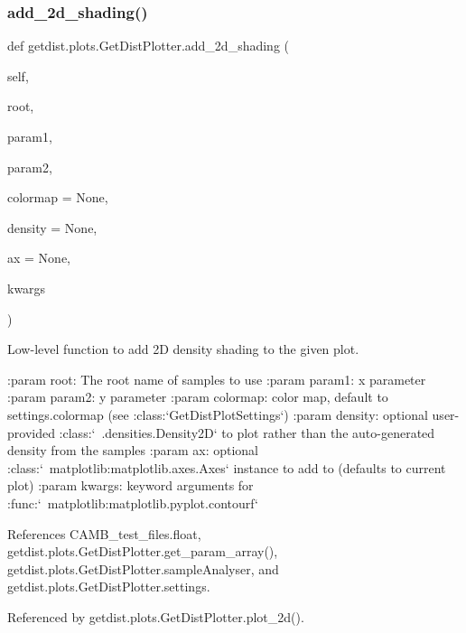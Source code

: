 \subsubsection{\texorpdfstring{add\+\_\+2d\+\_\+shading()}{add\_2d\_shading()}}
{\footnotesize\ttfamily def getdist.\+plots.\+Get\+Dist\+Plotter.\+add\+\_\+2d\+\_\+shading (\begin{DoxyParamCaption}\item[{}]{self,  }\item[{}]{root,  }\item[{}]{param1,  }\item[{}]{param2,  }\item[{}]{colormap = {\ttfamily None},  }\item[{}]{density = {\ttfamily None},  }\item[{}]{ax = {\ttfamily None},  }\item[{}]{kwargs }\end{DoxyParamCaption})}

\begin{DoxyVerb}Low-level function to add 2D density shading to the given plot.

:param root: The root name of samples to use
:param param1: x parameter
:param param2: y parameter
:param colormap: color map, default to settings.colormap (see :class:`GetDistPlotSettings`)
:param density: optional user-provided :class:`~.densities.Density2D` to plot rather than
        the auto-generated density from the samples
:param ax: optional :class:`~matplotlib:matplotlib.axes.Axes` instance to add to (defaults to current plot)
:param kwargs: keyword arguments for :func:`~matplotlib:matplotlib.pyplot.contourf`
\end{DoxyVerb}
 

References C\+A\+M\+B\+\_\+test\+\_\+files.\+float, getdist.\+plots.\+Get\+Dist\+Plotter.\+get\+\_\+param\+\_\+array(), getdist.\+plots.\+Get\+Dist\+Plotter.\+sample\+Analyser, and getdist.\+plots.\+Get\+Dist\+Plotter.\+settings.



Referenced by getdist.\+plots.\+Get\+Dist\+Plotter.\+plot\+\_\+2d().

